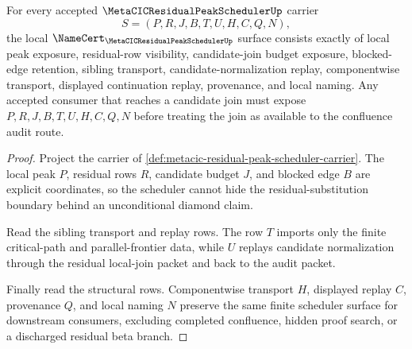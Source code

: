 \begin{theorem}
\label{thm:metacic-residual-peak-scheduler-namecert-obligations}
For every accepted $\MetaCICResidualPeakSchedulerUp$ carrier
$$
S=(P,R,J,B,T,U,H,C,Q,N),
$$
the local $\NameCert_{\MetaCICResidualPeakSchedulerUp}$ surface consists exactly of local peak exposure, residual-row visibility, candidate-join budget exposure, blocked-edge retention, sibling transport, candidate-normalization replay, componentwise transport, displayed continuation replay, provenance, and local naming. Any accepted consumer that reaches a candidate join must expose $P,R,J,B,T,U,H,C,Q,N$ before treating the join as available to the confluence audit route.
\end{theorem}
\begin{proof}
Project the carrier of \autoref{def:metacic-residual-peak-scheduler-carrier}. The local peak $P$, residual rows $R$, candidate budget $J$, and blocked edge $B$ are explicit coordinates, so the scheduler cannot hide the residual-substitution boundary behind an unconditional diamond claim.

Read the sibling transport and replay rows. The row $T$ imports only the finite critical-path and parallel-frontier data, while $U$ replays candidate normalization through the residual local-join packet and back to the audit packet.

Finally read the structural rows. Componentwise transport $H$, displayed replay $C$, provenance $Q$, and local naming $N$ preserve the same finite scheduler surface for downstream consumers, excluding completed confluence, hidden proof search, or a discharged residual beta branch.
\end{proof}

